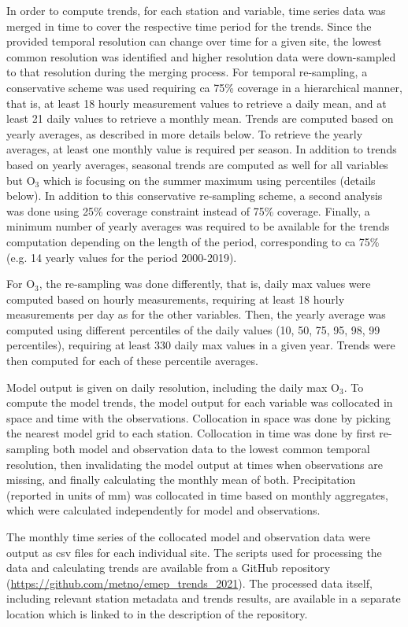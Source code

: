 In order to compute trends, for each station and variable, time series data was merged in time to cover the respective time period for the trends.
Since the provided temporal resolution can change over time for a given site, the lowest common resolution was identified and higher resolution data were down-sampled to that resolution during the merging process. For temporal re-sampling, a conservative scheme was used requiring ca 75\% coverage in a hierarchical manner, that is, at least 18 hourly measurement values to retrieve a daily mean, and at least 21 daily values to retrieve a monthly mean. Trends are computed based on yearly averages, as described in more details below. To retrieve the yearly averages, at least one monthly value is required per season. In addition to trends based on yearly averages, seasonal trends are computed as well for all variables but O$_{3}$ which is focusing on the summer maximum using percentiles (details below). In addition to this conservative re-sampling scheme, a second analysis was done using 25\% coverage constraint instead of 75\% coverage. Finally, a minimum number of yearly averages was required to be available for the trends computation depending on the length of the period, corresponding to ca 75\% (e.g. 14 yearly values for the period 2000-2019).

For O$_3$, the re-sampling was done differently, that is, daily max values were computed based on hourly measurements, requiring at least 18 hourly measurements per day as for the other variables. Then, the yearly average was computed using different percentiles of the daily values (10, 50, 75, 95, 98, 99 percentiles), requiring at least 330 daily max values in a given year. Trends were then computed for each of these percentile averages.

Model output is given on daily resolution, including the daily max O$_3$. To compute the model trends, the model output for each variable was collocated in space and time with the observations. Collocation in space was done by picking the nearest model grid to each station. Collocation in time was done by first re-sampling both model and observation data to the lowest common temporal resolution, then invalidating the model output at times when observations are missing, and finally calculating the monthly mean of both. Precipitation (reported in units of mm) was collocated in time based on monthly aggregates, which were calculated independently for model and observations.

The monthly time series of the collocated model and observation data were output as csv files for each individual site. The scripts used for processing the data and calculating trends are available from a GitHub repository (\url{https://github.com/metno/emep_trends_2021}). The processed data itself, including relevant station metadata and trends results, are available in a separate location which is linked to in the description of the repository.

